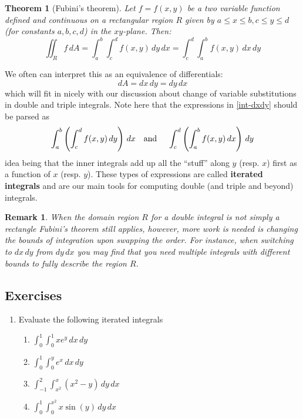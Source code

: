 \documentclass[12pt]{article}
\numberwithin{equation}{subsection}
\numberwithin{figure}{subsection}
\newtheorem{thm}[subsection]{Theorem}
\theoremstyle{note}
\newtheorem{remark}[subsection]{Remark}
\begin{document}
{\begin{thm}[Fubini's theorem] \label{thm-fubini}Let $f=f(x,y)$ be a two variable function defined and continuous on a rectangular region $R$ given by $a\leq x\leq b, c\leq y\leq d$ (for constants $a,b,c,d$) in the $xy$-plane. Then: \begin{equation} \label{int-dxdy} 
	\iint_R f\,dA= \int_a^b \int_c^d f(x,y) \,dy \,dx= \int_c^d \int_a^b f(x,y) \,dx\,dy
\end{equation}
\end{thm}
We often can interpret this as an equivalence of differentials: \begin{equation} \label{differentials-1} dA=dx\,dy =dy\,dx\end{equation} which will fit in nicely with our discussion about change of variable substitutions in double and triple integrals. Note here that the expressions in \eqref{int-dxdy} should be parsed as \[ \int_a^b \left(\int_c^d f(x,y) \,dy\right) \,dx  \text{\quad and \quad } \int_c^d \left( \int_a^b f(x,y) \,dx \right) \,dy \] idea being that the inner integrals add up all the ``stuff'' along $y$ (resp. $x$) first as a function of $x$ (resp. $y$). These types of expressions are called \textbf{iterated integrals} and are our main tools for computing double (and triple and beyond) integrals. 

\begin{remark}When the domain region $R$ for a double integral is not simply a rectangle Fubini's theorem still applies, however, more work is needed is changing the bounds of integration upon swapping the order. For instance, when switching to $dx\,dy$ from $dy\,dx$ you may find that you need multiple integrals with different bounds to fully describe the region $R$. \end{remark}

\subsection{Exercises}
\begin{enumerate}[label=\arabic*.]
\item Evaluate the following iterated integrals

\begin{enumerate}
	\item $\displaystyle \int_0^1 \int_0^1 xe^y\,dx\,dy$
	\item $\displaystyle \int_0^1 \int_0^y e^x\,dx\,dy$
	\item $\displaystyle \int_{-1}^2 \int_{x^2}^{x}( x^2-y)\,dy\,dx$
	\item $\displaystyle \int_0^1 \int_0^{x^2} x\sin(y)\,dy\,dx$
\end{enumerate}


\end{enumerate}}
\end{document}
